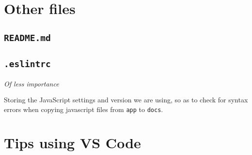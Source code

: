 \section{Other files}

\subsection{\texttt{README.md}}
\label{sec:readme}

\subsection{\texttt{.eslintrc}}

\textit{Of less importance}

Storing the JavaScript settings and version we are using, so as to check for syntax errors when copying javascript files from \texttt{app} to \texttt{docs}.

\section{Tips using VS Code}
